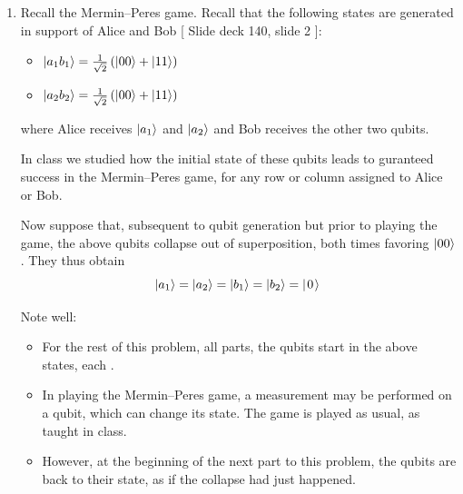 \documentclass[12pt]{article}
\begin{document}
\begin{enumerate}
\item{} Recall the Mermin--Peres game. Recall that the following states are generated in support of Alice and Bob [ Slide deck 140, slide 2 ]:
\begin{itemize}
    \item $\ket{a_{1}b_{1}} = \frac{1}{\sqrt{2}}{}\left(\ket{00} + \ket{11}\right)$
    \item $\ket{a_{2}b_{2}} = \frac{1}{\sqrt{2}}{}\left(\ket{00} + \ket{11}\right)$
\end{itemize}
where Alice receives $\ket{a_{1}}$ and $\ket{a_{2}}$ and Bob receives the other two qubits.

In class we studied how the initial state of these qubits leads to guranteed success in the Mermin--Peres game, for any row or column assigned to Alice or Bob.

Now suppose that, subsequent to qubit generation but prior to playing the game, the above qubits collapse out of superposition, both times favoring $\ket{00}$.  They thus obtain  \[
\ket{a_1}=\ket{a_2}=\ket{b_1}=\ket{b_2}=\QZero{}
\]

Note well:
\begin{itemize}
\item For the rest of this problem, all parts, the qubits start in the above states, each \QZero{}.
\item In playing the Mermin--Peres game, a measurement may be performed on a qubit, which can change its state.  The game is played as usual, as taught in class.
\item However, at the beginning of the next part to this problem, the qubits are back to their \QZero{} state, as if the collapse had just happened.
\end{itemize}


\end{enumerate}
\end{document}
